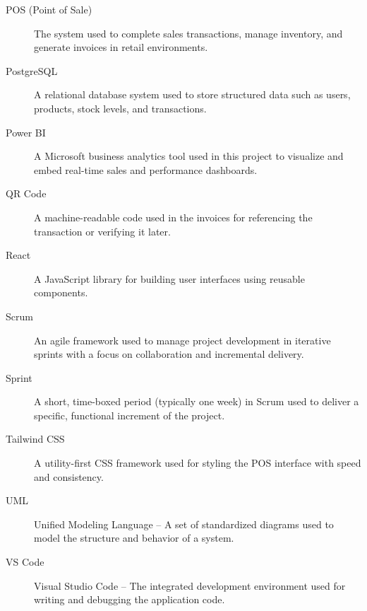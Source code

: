 \begin{description}
  \item[POS (Point of Sale)] The system used to complete sales transactions, manage inventory, and generate invoices in retail environments.

  \item[PostgreSQL] A relational database system used to store structured data such as users, products, stock levels, and transactions.

  \item[Power BI] A Microsoft business analytics tool used in this project to visualize and embed real-time sales and performance dashboards.

  \item[QR Code] A machine-readable code used in the invoices for referencing the transaction or verifying it later.

  \item[React] A JavaScript library for building user interfaces using reusable components.

  \item[Scrum] An agile framework used to manage project development in iterative sprints with a focus on collaboration and incremental delivery.

  \item[Sprint] A short, time-boxed period (typically one week) in Scrum used to deliver a specific, functional increment of the project.

  \item[Tailwind CSS] A utility-first CSS framework used for styling the POS interface with speed and consistency.

  \item[UML] Unified Modeling Language – A set of standardized diagrams used to model the structure and behavior of a system.

  \item[VS Code] Visual Studio Code – The integrated development environment used for writing and debugging the application code.

\end{description}
